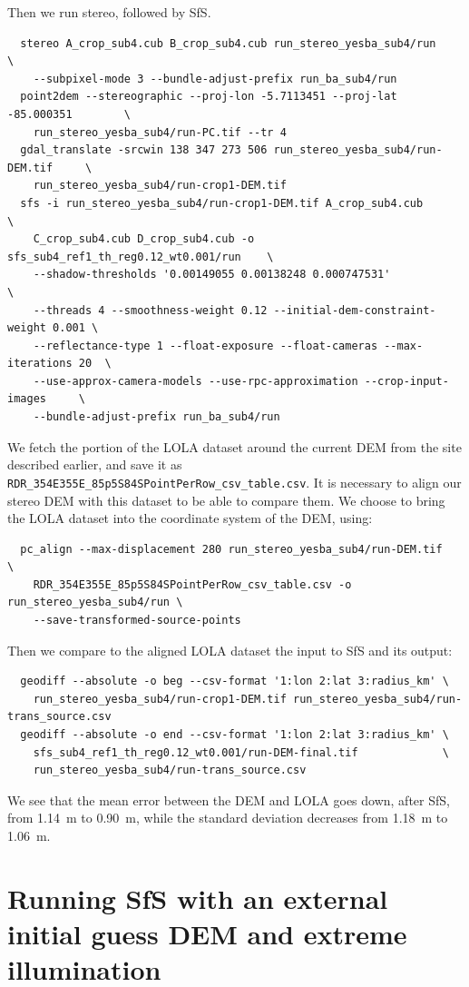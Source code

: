 Then we run stereo, followed by SfS. 
\begin{verbatim}
  stereo A_crop_sub4.cub B_crop_sub4.cub run_stereo_yesba_sub4/run             \
    --subpixel-mode 3 --bundle-adjust-prefix run_ba_sub4/run
  point2dem --stereographic --proj-lon -5.7113451 --proj-lat -85.000351        \
    run_stereo_yesba_sub4/run-PC.tif --tr 4
  gdal_translate -srcwin 138 347 273 506 run_stereo_yesba_sub4/run-DEM.tif     \
    run_stereo_yesba_sub4/run-crop1-DEM.tif 
  sfs -i run_stereo_yesba_sub4/run-crop1-DEM.tif A_crop_sub4.cub               \
    C_crop_sub4.cub D_crop_sub4.cub -o sfs_sub4_ref1_th_reg0.12_wt0.001/run    \
    --shadow-thresholds '0.00149055 0.00138248 0.000747531'                    \
    --threads 4 --smoothness-weight 0.12 --initial-dem-constraint-weight 0.001 \
    --reflectance-type 1 --float-exposure --float-cameras --max-iterations 20  \
    --use-approx-camera-models --use-rpc-approximation --crop-input-images     \
    --bundle-adjust-prefix run_ba_sub4/run
\end{verbatim}

We fetch the portion of the LOLA dataset around the current DEM from the
site described earlier, and save it as
\verb#RDR_354E355E_85p5S84SPointPerRow_csv_table.csv#. It is necessary
to align our stereo DEM with this dataset to be able to compare
them. We choose to bring the LOLA dataset into the coordinate system
of the DEM, using:
\begin{verbatim}
  pc_align --max-displacement 280 run_stereo_yesba_sub4/run-DEM.tif             \
    RDR_354E355E_85p5S84SPointPerRow_csv_table.csv -o run_stereo_yesba_sub4/run \
    --save-transformed-source-points
\end{verbatim}

Then we compare to the aligned LOLA dataset the input to SfS and its output:
\begin{verbatim}
  geodiff --absolute -o beg --csv-format '1:lon 2:lat 3:radius_km' \
    run_stereo_yesba_sub4/run-crop1-DEM.tif run_stereo_yesba_sub4/run-trans_source.csv
  geodiff --absolute -o end --csv-format '1:lon 2:lat 3:radius_km' \
    sfs_sub4_ref1_th_reg0.12_wt0.001/run-DEM-final.tif             \
    run_stereo_yesba_sub4/run-trans_source.csv
\end{verbatim}

We see that the mean error between the DEM and LOLA goes down, after SfS,
from  1.14~m to 0.90~m, while the standard deviation decreases from
1.18~m to 1.06~m.

\section{Running SfS with an external initial guess DEM and extreme illumination}

